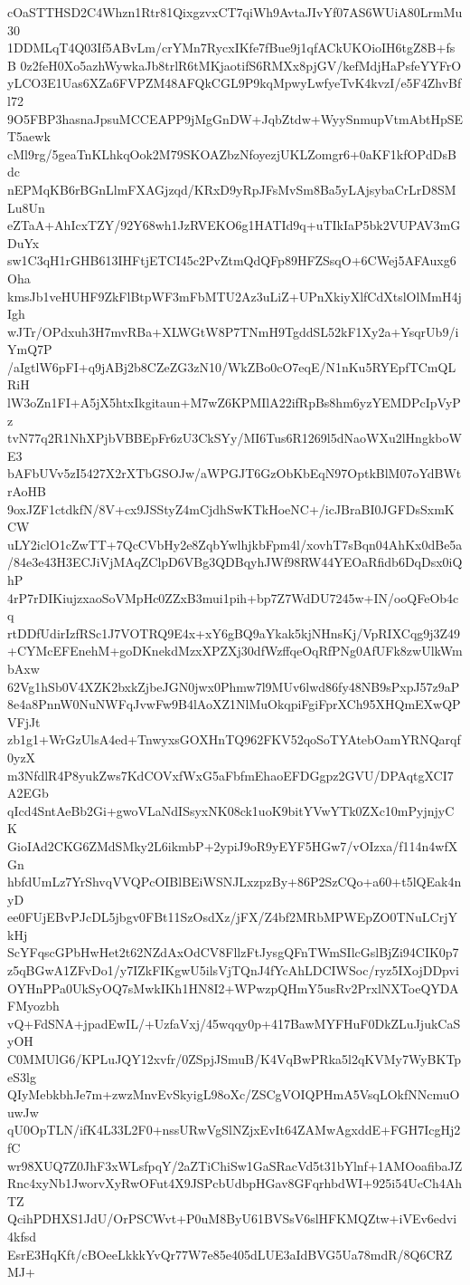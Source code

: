 cOaSTTHSD2C4Whzn1Rtr81QixgzvxCT7qiWh9AvtaJIvYf07AS6WUiA80LrmMu30
1DDMLqT4Q03If5ABvLm/crYMn7RycxIKfe7fBue9j1qfACkUKOioIH6tgZ8B+fsB
0z2feH0Xo5azhWywkaJb8trlR6tMKjaotifS6RMXx8pjGV/kefMdjHaPsfeYYFrO
yLCO3E1Uas6XZa6FVPZM48AFQkCGL9P9kqMpwyLwfyeTvK4kvzI/e5F4ZhvBfl72
9O5FBP3hasnaJpsuMCCEAPP9jMgGnDW+JqbZtdw+WyySnmupVtmAbtHpSET5aewk
cMl9rg/5geaTnKLhkqOok2M79SKOAZbzNfoyezjUKLZomgr6+0aKF1kfOPdDsBdc
nEPMqKB6rBGnLlmFXAGjzqd/KRxD9yRpJFsMvSm8Ba5yLAjsybaCrLrD8SMLu8Un
eZTaA+AhIcxTZY/92Y68wh1JzRVEKO6g1HATId9q+uTIkIaP5bk2VUPAV3mGDuYx
sw1C3qH1rGHB613IHFtjETCI45c2PvZtmQdQFp89HFZSsqO+6CWej5AFAuxg6Oha
kmsJb1veHUHF9ZkFlBtpWF3mFbMTU2Az3uLiZ+UPnXkiyXlfCdXtslOlMmH4jIgh
wJTr/OPdxuh3H7mvRBa+XLWGtW8P7TNmH9TgddSL52kF1Xy2a+YsqrUb9/iYmQ7P
/aIgtlW6pFI+q9jABj2b8CZeZG3zN10/WkZBo0cO7eqE/N1nKu5RYEpfTCmQLRiH
lW3oZn1FI+A5jX5htxIkgitaun+M7wZ6KPMIlA22ifRpBs8hm6yzYEMDPcIpVyPz
tvN77q2R1NhXPjbVBBEpFr6zU3CkSYy/MI6Tus6R1269l5dNaoWXu2lHngkboWE3
bAFbUVv5zI5427X2rXTbGSOJw/aWPGJT6GzObKbEqN97OptkBlM07oYdBWtrAoHB
9oxJZF1ctdkfN/8V+cx9JSStyZ4mCjdhSwKTkHoeNC+/icJBraBI0JGFDsSxmKCW
uLY2iclO1cZwTT+7QcCVbHy2e8ZqbYwlhjkbFpm4l/xovhT7sBqn04AhKx0dBe5a
/84e3e43H3ECJiVjMAqZClpD6VBg3QDBqyhJWf98RW44YEOaRfidb6DqDsx0iQhP
4rP7rDIKiujzxaoSoVMpHc0ZZxB3mui1pih+bp7Z7WdDU7245w+IN/ooQFeOb4cq
rtDDfUdirIzfRSc1J7VOTRQ9E4x+xY6gBQ9aYkak5kjNHnsKj/VpRIXCqg9j3Z49
+CYMcEFEnehM+goDKnekdMzxXPZXj30dfWzffqeOqRfPNg0AfUFk8zwUlkWmbAxw
62Vg1hSb0V4XZK2bxkZjbeJGN0jwx0Phmw7l9MUv6lwd86fy48NB9sPxpJ57z9aP
8e4a8PnnW0NuNWFqJvwFw9B4lAoXZ1NlMuOkqpiFgiFprXCh95XHQmEXwQPVFjJt
zb1g1+WrGzUlsA4ed+TnwyxsGOXHnTQ962FKV52qoSoTYAtebOamYRNQarqf0yzX
m3NfdlR4P8yukZws7KdCOVxfWxG5aFbfmEhaoEFDGgpz2GVU/DPAqtgXCI7A2EGb
qIcd4SntAeBb2Gi+gwoVLaNdISsyxNK08ck1uoK9bitYVwYTk0ZXc10mPyjnjyCK
GioIAd2CKG6ZMdSMky2L6ikmbP+2ypiJ9oR9yEYF5HGw7/vOIzxa/f114n4wfXGn
hbfdUmLz7YrShvqVVQPcOIBlBEiWSNJLxzpzBy+86P2SzCQo+a60+t5lQEak4nyD
ee0FUjEBvPJcDL5jbgv0FBt11SzOsdXz/jFX/Z4bf2MRbMPWEpZO0TNuLCrjYkHj
ScYFqscGPbHwHet2t62NZdAxOdCV8FllzFtJysgQFnTWmSIlcGslBjZi94CIK0p7
z5qBGwA1ZFvDo1/y7IZkFIKgwU5ilsVjTQnJ4fYcAhLDCIWSoc/ryz5IXojDDpvi
OYHnPPa0UkSyOQ7sMwkIKh1HN8I2+WPwzpQHmY5usRv2PrxlNXToeQYDAFMyozbh
vQ+FdSNA+jpadEwIL/+UzfaVxj/45wqqy0p+417BawMYFHuF0DkZLuJjukCaSyOH
C0MMUlG6/KPLuJQY12xvfr/0ZSpjJSmuB/K4VqBwPRka5l2qKVMy7WyBKTpeS3lg
QIyMebkbhJe7m+zwzMnvEvSkyigL98oXc/ZSCgVOIQPHmA5VsqLOkfNNcmuOuwJw
qU0OpTLN/ifK4L33L2F0+nssURwVgSlNZjxEvIt64ZAMwAgxddE+FGH7IcgHj2fC
wr98XUQ7Z0JhF3xWLsfpqY/2aZTiChiSw1GaSRacVd5t31bYlnf+1AMOoafibaJZ
Rnc4xyNb1JworvXyRwOFut4X9JSPcbUdbpHGav8GFqrhbdWI+925i54UcCh4AhTZ
QcihPDHXS1JdU/OrPSCWvt+P0uM8ByU61BVSsV6slHFKMQZtw+iVEv6edvi4kfsd
EsrE3HqKft/cBOeeLkkkYvQr77W7e85e405dLUE3aIdBVG5Ua78mdR/8Q6CRZMJ+
